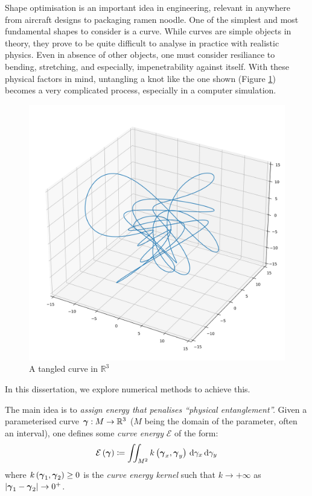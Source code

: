 \documentclass[../dissertation.tex]{subfiles}
\begin{document}
Shape optimisation is an important idea in engineering, relevant in anywhere from aircraft designs to packaging ramen noodle.
One of the simplest and most fundamental shapes to consider is a curve.
While curves are simple objects in theory, they prove to be quite difficult to analyse in practice with realistic physics.
Even in absence of other objects, one must consider resiliance to bending, stretching, and especially, impenetrability against itself.
With these physical factors in mind, untangling a knot like the one shown (Figure \ref{fig: Knot}) becomes a very complicated process,
especially in a computer simulation.
\begin{figure}[tpb]
    \centering
    \includegraphics[scale=0.3]{sections/introductionImgs/knot}
    \caption{A tangled curve in $\mathbb{R}^3$}
    \label{fig: Knot}
\end{figure}
In this dissertation, we explore numerical methods to achieve this.

The main idea is to \emph{assign energy that penalises ``physical entanglement''.}
Given a parameterised curve $\boldsymbol{\gamma}:M \rightarrow \mathbb{R}^3$ ($M$ being the domain of the parameter, often an interval),
one defines some \emph{curve energy} $\mathcal{E}$ of the form:
\begin{equation}
    \mathcal{E} \left( \boldsymbol{\gamma} \right) \coloneqq \iint_{M^2} k\left( \boldsymbol{\gamma}_x, \boldsymbol{\gamma}_y \right) \, \text{d} \gamma_x \, \text{d} \gamma_y
\end{equation}
where $k\left( \boldsymbol{\gamma}_1, \boldsymbol{\gamma}_2 \right) \geq 0$ is the \emph{curve energy kernel} such that $k \rightarrow +\infty$ as $\abs{\gammabf_1 - \gammabf_2} \rightarrow 0^+$.
\end{document}
